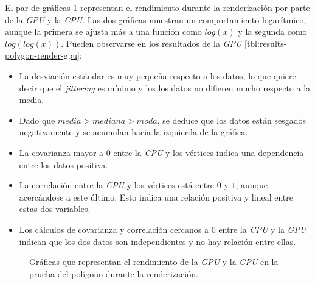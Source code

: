 El par de gráficas \ref{fig:polygon-graphs-render} representan el rendimiento durante la renderización por parte de la \textit{GPU} y la \textit{CPU}. Las dos gráficas muestran un comportamiento logarítmico, aunque la primera se ajusta más a una función como $log(x)$ y la segunda como $log(log(x))$. Pueden observarse en los resultados de la \textit{GPU} \ref{tbl:results-polygon-render-gpu}:

\begin{itemize}

    \item La desviación estándar es muy pequeña respecto a los datos, lo que quiere decir que el \textit{jittering} es mínimo y los los datos no difieren mucho respecto a la media. 
    
    \item Dado que $media > mediana > moda$, se deduce que los datos están sesgados negativamente y se acumulan hacia la izquierda de la gráfica.
    
    \item La covarianza mayor a $0$ entre la \textit{CPU} y los vértices indica una dependencia entre los datos positiva.
    
    \item La correlación entre la \textit{CPU} y los vértices está entre $0$ y $1$, aunque acercándose a este último. Esto indica una relación positiva y lineal entre estas dos variables.
    
    \item Los cálculos de covarianza y correlación cercanos a $0$ entre la \textit{CPU} y la \textit{GPU} indican que los dos datos son independientes y no hay relación entre ellas.

\end{itemize}

\FloatBarrier
\begin{figure}[htp]
    \centering
    
    \caption{Gráficas que representan el rendimiento de la \textit{GPU} y la \textit{CPU} en la prueba del polígono durante la renderización.}
    \label{fig:polygon-graphs-render}
\end{figure}


\FloatBarrier

